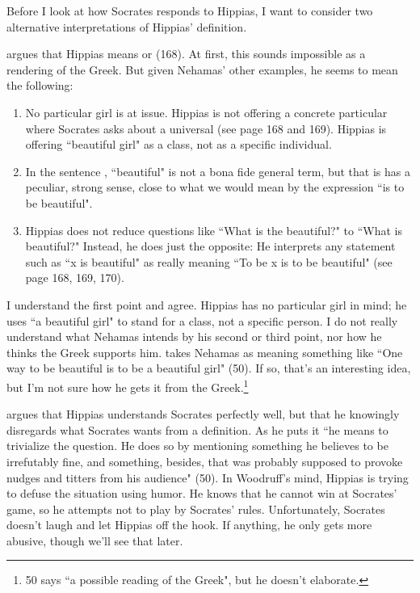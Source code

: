 \documentclass[11pt]{article}
\begin{document}
Before I look at how Socrates responds to Hippias, I want to consider two alternative interpretations of Hippias' definition.

\citet{nehamas1975a} argues that Hippias means  or  (168).  At first, this sounds impossible as a rendering of the Greek.  But given Nehamas' other examples, he seems to mean the following:

\begin{enumerate}
    \item No particular girl is at issue.  Hippias is not offering a concrete particular where Socrates asks about a universal (see page 168 and 169).  Hippias is offering ``beautiful girl" as a class, not as a specific individual.
    \item In the sentence , ``beautiful" is not a bona fide general term, but that is has a peculiar, strong sense, close to what we would mean by the expression ``is to be beautiful".
    \item Hippias does not reduce questions like ``What is the beautiful?" to ``What is beautiful?"  Instead, he does just the opposite: He interprets any statement such as ``x is beautiful" as really meaning ``To be x is to be beautiful" (see page 168, 169, 170).
\end{enumerate}

I understand the first point and agree.  Hippias has no particular girl in mind; he uses ``a beautiful girl" to stand for a class, not a specific person. I do not really understand what Nehamas intends by his second or third point, nor how he thinks the Greek supports him.  \citet{woodruff1982} takes Nehamas as meaning something like ``One way to be beautiful is to be a beautiful girl" (50).  If so, that's an interesting idea, but I'm not sure how he gets it from the Greek.\footnote{\citet{woodruff1982} 50 says ``a possible reading of the Greek", but he doesn't elaborate.}

\citet{woodruff1982} argues that Hippias understands Socrates perfectly well, but that he knowingly disregards what Socrates wants from a definition.  As he puts it ``he means to trivialize the question.  He does so by mentioning something he believes to be irrefutably fine, and something, besides, that was probably supposed to provoke nudges and titters from his audience" (50).  In Woodruff's mind, Hippias is trying to defuse the situation using humor.  He knows that he cannot win at Socrates' game, so he attempts not to play by Socrates' rules.  Unfortunately, Socrates doesn't laugh and let Hippias off the hook.  If anything, he only gets more abusive, though we'll see that later.
\end{document}
